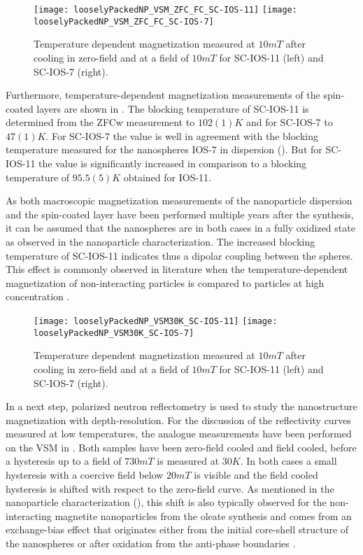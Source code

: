 \documentclass[\main/dresen_thesis.tex]{subfiles}
\begin{document}
  \begin{figure}[tb]
    \centering
    \texttt{[image: looselyPackedNP\_VSM\_ZFC\_FC\_SC-IOS-11]}
    \texttt{[image: looselyPackedNP\_VSM\_ZFC\_FC\_SC-IOS-7]}
    \caption{\label{fig:looselyPackedNP:layer:vsmZFCFC}Temperature dependent magnetization measured at $10 \unit{mT}$ after cooling in zero-field and at a field of $10 \unit{mT}$ for SC-IOS-11 (left) and SC-IOS-7 (right).}
  \end{figure}

  Furthermore, temperature-dependent magnetization measurements of the spin-coated layers are shown in .
  The blocking temperature of SC-IOS-11 is determined from the ZFCw measurement to $102(1) \unit{K}$ and for SC-IOS-7 to $47(1) \unit{K}$.
  For SC-IOS-7 the value is well in agreement with the blocking temperature measured for the nanospheres IOS-7 in dispersion ().
  But for SC-IOS-11 the value is significantly increased in comparison to a blocking temperature of $95.5(5) \unit{K}$ obtained for IOS-11.

  As both macroscopic magnetization measurements of the nanoparticle dispersion and the spin-coated layer have been performed multiple years after the synthesis, it can be assumed that the nanospheres are in both cases in a fully oxidized state as observed in the nanoparticle characterization.
  The increased blocking temperature of SC-IOS-11 indicates thus a dipolar coupling between the spheres.
  This effect is commonly observed in literature when the temperature-dependent magnetization of non-interacting particles is compared to particles at high concentration \cite{Morup_2010_Magne, Pauly_2012_Sized, Otero_2000_Influ}.

  \begin{figure}[tb]
    \centering
    \texttt{[image: looselyPackedNP\_VSM30K\_SC-IOS-11]}
    \texttt{[image: looselyPackedNP\_VSM30K\_SC-IOS-7]}
    \caption{\label{fig:looselyPackedNP:layer:vsm30K}Temperature dependent magnetization measured at $10 \unit{mT}$ after cooling in zero-field and at a field of $10 \unit{mT}$ for SC-IOS-11 (left) and SC-IOS-7 (right).}
  \end{figure}
  In a next step, polarized neutron reflectometry is used to study the nanostructure magnetization with depth-resolution.
  For the discussion of the reflectivity curves measured at low temperatures, the analogue measurements have been performed on the VSM in .
  Both samples have been zero-field cooled and field cooled, before a hysteresis up to a field of $730 \unit{mT}$ is measured at $30 \unit{K}$.
  In both cases a small hysteresis with a coercive field below $20 \unit{mT}$ is visible and the field cooled hysteresis is shifted with respect to the zero-field curve.
  As mentioned in the nanoparticle characterization (), this shift is also typically observed for the non-interacting magnetite nanoparticles from the oleate synthesis and comes from an exchange-bias effect that originates either from the initial core-shell structure of the nanospheres or after oxidation from the anti-phase boundaries \cite{Wetterskog_2013_Anoma}.
\end{document}
